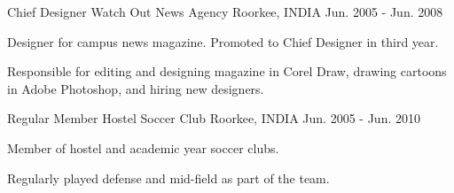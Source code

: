 \begin{cventries}
  \cventry
    {Chief Designer} %
    {Watch Out News Agency} %
    {Roorkee, INDIA} %
    {Jun. 2005 - Jun. 2008} %
    {
      \begin{cvitems} %
        \item {Designer for campus news magazine. Promoted to Chief Designer in third year.}
        \item {Responsible for editing and designing magazine in Corel Draw, drawing cartoons in Adobe Photoshop, and hiring new designers.}
      \end{cvitems}
    }

  \cventry
    {Regular Member} %
    {Hostel Soccer Club} %
    {Roorkee, INDIA} %
    {Jun. 2005 - Jun. 2010} %
    {
      \begin{cvitems} %
        \item {Member of hostel and academic year soccer clubs.}
        \item {Regularly played defense and mid-field as part of the team.}
      \end{cvitems}
    }
    
\end{cventries}

